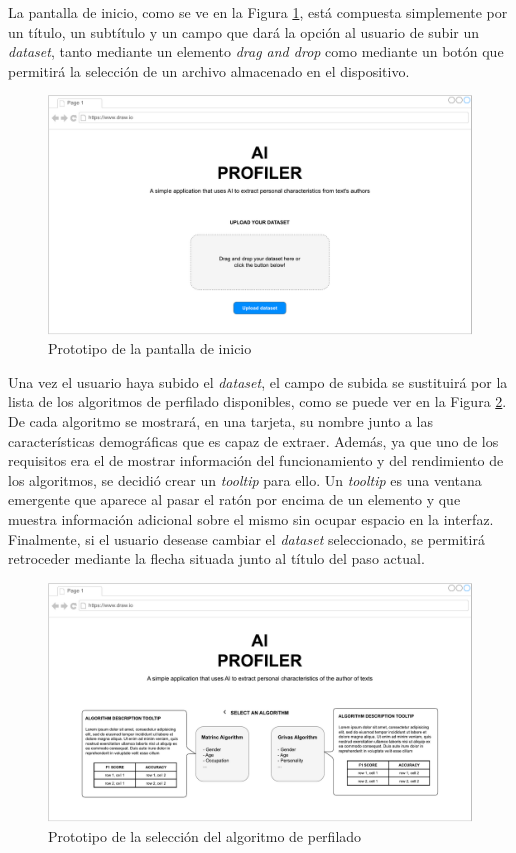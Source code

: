 \bigskip
La pantalla de inicio, como se ve en la Figura \ref{fig:prototipo_inicio}, está compuesta simplemente por un título, 
un subtítulo y un campo que dará la opción al usuario de subir un \textit{dataset}, tanto mediante un elemento \textit{drag and drop} como
mediante un botón que permitirá la selección de un archivo almacenado en el dispositivo.

\bigskip
\begin{figure}[H]
	\centering
	\includegraphics[width=\textwidth]{diagramas/landing.pdf}
	\caption{Prototipo de la pantalla de inicio}
	\label{fig:prototipo_inicio}
\end{figure}

\bigskip
Una vez el usuario haya subido el \textit{dataset}, el campo de subida se sustituirá por la lista de los
algoritmos de perfilado disponibles, como se puede ver en la Figura \ref{fig:prototipo_algoritmo_perfilado}. De cada algoritmo se mostrará,
en una tarjeta, su nombre junto a las características demográficas que es capaz de extraer. Además, ya que uno de los requisitos era el de mostrar información del funcionamiento
y del rendimiento de los algoritmos, se decidió crear un \textit{tooltip} para ello. Un \textit{tooltip} es una ventana emergente
que aparece al pasar el ratón por encima de un elemento y que muestra información adicional sobre el mismo sin ocupar espacio
en la interfaz. Finalmente, si el usuario desease cambiar el \textit{dataset} seleccionado, se permitirá retroceder mediante
la flecha situada junto al título del paso actual.

\bigskip
\begin{figure}[H]
	\centering
	\includegraphics[width=\textwidth]{diagramas/landing-algorithm.pdf}
	\caption{Prototipo de la selección del algoritmo de perfilado}
	\label{fig:prototipo_algoritmo_perfilado}
\end{figure}


